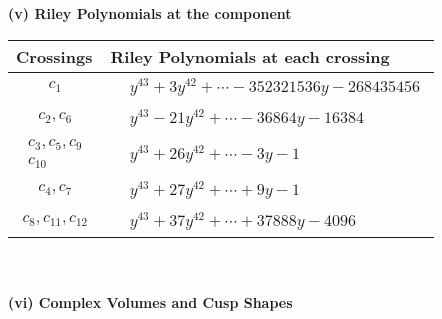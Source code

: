 \documentclass[1p]{elsarticle_modified}
\theoremstyle{definition}
\begin{document}
\newpage\renewcommand{\arraystretch}{1}
\flushleft \textbf{(v) Riley Polynomials at the component}\newline \\
\begin{tabular}{m{50pt}|m{274pt}}
Crossings & \hspace{64pt}Riley Polynomials at each crossing \\
\hline $$\begin{aligned}c_{1}\end{aligned}$$&$\begin{aligned}
&y^{43}+3 y^{42}+\cdots-352321536 y-268435456
\end{aligned}$\\
\hline $$\begin{aligned}c_{2},c_{6}\end{aligned}$$&$\begin{aligned}
&y^{43}-21 y^{42}+\cdots-36864 y-16384
\end{aligned}$\\
\hline $$\begin{aligned}c_{3},c_{5},c_{9}\\c_{10}\end{aligned}$$&$\begin{aligned}
&y^{43}+26 y^{42}+\cdots-3 y-1
\end{aligned}$\\
\hline $$\begin{aligned}c_{4},c_{7}\end{aligned}$$&$\begin{aligned}
&y^{43}+27 y^{42}+\cdots+9 y-1
\end{aligned}$\\
\hline $$\begin{aligned}c_{8},c_{11},c_{12}\end{aligned}$$&$\begin{aligned}
&y^{43}+37 y^{42}+\cdots+37888 y-4096
\end{aligned}$\\
\hline
\end{tabular}\\~\\
\newpage\flushleft \textbf{(vi) Complex Volumes and Cusp Shapes}
\end{document}
